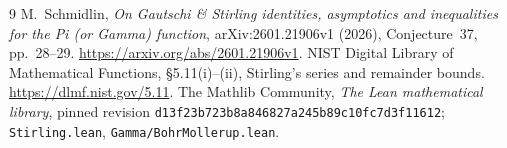 \documentclass[11pt]{article}
\begin{document}
\begin{thebibliography}{9}
 M.~Schmidlin, \emph{On Gautschi \& Stirling identities, asymptotics
and inequalities for the Pi (or Gamma) function}, arXiv:2601.21906v1 (2026),
Conjecture~37, pp.~28--29. \url{https://arxiv.org/abs/2601.21906v1}.
 NIST Digital Library of Mathematical Functions,
\S5.11(i)--(ii), Stirling's series and remainder bounds.
\url{https://dlmf.nist.gov/5.11}.
 The Mathlib Community, \emph{The Lean mathematical library},
pinned revision \texttt{d13f23b723b8a846827a245b89c10fc7d3f11612};
\texttt{Stirling.lean}, \texttt{Gamma/BohrMollerup.lean}.
\end{thebibliography}
\end{document}
